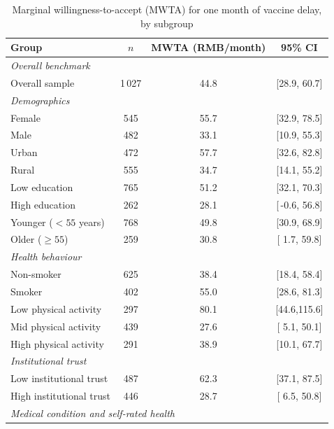 \begin{table}[htbp]
\centering

\begin{threeparttable}
\caption{Marginal willingness-to-accept (MWTA) for one month of vaccine delay, by subgroup}
\label{tab:subgroup_mwta}
\setlength{\tabcolsep}{4.5pt}
\footnotesize
\begin{tabular}{lccc}
\toprule
\textbf{Group} & \textbf{$n$} & \textbf{MWTA (RMB/month)} & \textbf{95\% CI} \\
\midrule
\multicolumn{4}{l}{\textit{Overall benchmark}} \\
\quad Overall sample        & 1\,027 & 44.8 & [28.9, 60.7] \\
\midrule
\multicolumn{4}{l}{\textit{Demographics}} \\
\quad Female                &   545  & 55.7 & [32.9, 78.5] \\
\quad Male                  &   482  & 33.1 & [10.9, 55.3] \\
\quad Urban                 &   472  & 57.7 & [32.6, 82.8] \\
\quad Rural                 &   555  & 34.7 & [14.1, 55.2] \\
\quad Low education         &   765  & 51.2 & [32.1, 70.3] \\
\quad High education        &   262  & 28.1 & [\,-0.6, 56.8] \\
\quad Younger ($<55$ years) &   768  & 49.8 & [30.9, 68.9] \\
\quad Older ($\geq 55$)     &   259  & 30.8 & [  1.7, 59.8] \\
\midrule
\multicolumn{4}{l}{\textit{Health behaviour}} \\
\quad Non-smoker            &   625  & 38.4 & [18.4, 58.4] \\
\quad Smoker                &   402  & 55.0 & [28.6, 81.3] \\
\quad Low physical activity &   297  & 80.1 & [44.6,115.6] \\
\quad Mid physical activity &   439  & 27.6 & [  5.1, 50.1] \\
\quad High physical activity&   291  & 38.9 & [10.1, 67.7] \\
\midrule
\multicolumn{4}{l}{\textit{Institutional trust}} \\
\quad Low institutional trust   &   487  & 62.3 & [37.1, 87.5] \\
\quad High institutional trust  &   446  & 28.7 & [  6.5, 50.8] \\
\midrule
\multicolumn{4}{l}{\textit{Medical condition and self-rated health}} \\

\end{tabular}
\end{threeparttable}
\end{table}
